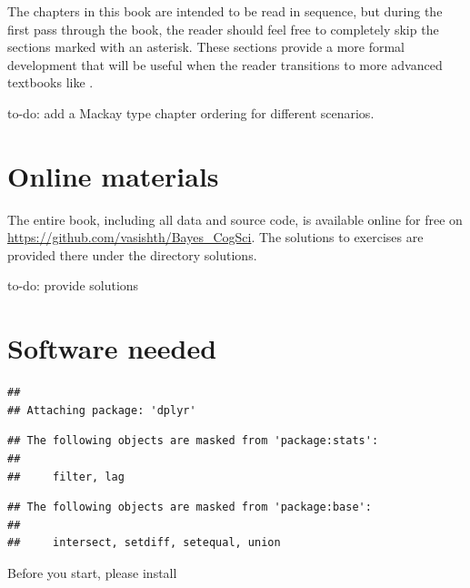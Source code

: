 \documentclass[12pt,]{krantz}
\theoremstyle{definition}
\theoremstyle{definition}
\theoremstyle{definition}
\theoremstyle{remark}
\let\BeginKnitrBlock\begin \let\EndKnitrBlock\end
\begin{document}
The chapters in this book are intended to be read in sequence, but during the first pass through the book, the reader should feel free to completely skip the sections marked with an asterisk. These sections provide a more formal development that will be useful when the reader transitions to more advanced textbooks like \citet{Gelman14}.

\BeginKnitrBlock{rmdnote}
to-do: add a Mackay type chapter ordering for different scenarios.
\EndKnitrBlock{rmdnote}

\hypertarget{online-materials}{%
\section{Online materials}\label{online-materials}}

The entire book, including all data and source code, is available online for free on \url{https://github.com/vasishth/Bayes_CogSci}. The solutions to exercises are provided there under the directory solutions.

\BeginKnitrBlock{rmdnote}
to-do: provide solutions
\EndKnitrBlock{rmdnote}

\hypertarget{software-needed}{%
\section{Software needed}\label{software-needed}}

\begin{verbatim}
## 
## Attaching package: 'dplyr'
\end{verbatim}

\begin{verbatim}
## The following objects are masked from 'package:stats':
## 
##     filter, lag
\end{verbatim}

\begin{verbatim}
## The following objects are masked from 'package:base':
## 
##     intersect, setdiff, setequal, union
\end{verbatim}

Before you start, please install
\end{document}

